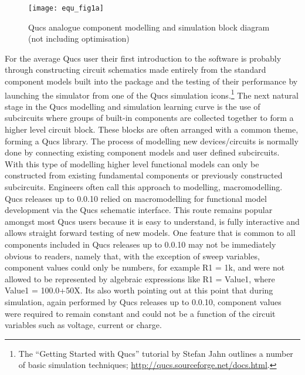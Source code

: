 \begin{figure}
  \centering 
  \texttt{[image: equ\_fig1a]}
  \caption{Qucs analogue component modelling and simulation block diagram (not including optimisation)}
  \label{fig:equ_1}
\end{figure} 

\vspace{5mm}
For the average Qucs user their first introduction to the software is
probably through constructing circuit schematics made entirely from
the standard component models built into the package and the testing
of their performance by launching the simulator from one of the Qucs
simulation icons.\footnote{The ``Getting Started with Qucs'' tutorial
by Stefan Jahn outlines a number of basic simulation techniques;
\url{http://qucs.sourceforge.net/docs.html}.}  The next natural stage
in the Qucs modelling and simulation learning curve is the use of
subcircuits where groups of built-in components are collected together
to form a higher level circuit block.  These blocks are often arranged
with a common theme, forming a Qucs library. The process of modelling
new devices/circuits is normally done by connecting existing component
models and user defined subcircuits. With this type of modelling
higher level functional models can only be constructed from existing
fundamental components or previously constructed
subcircuits. Engineers often call this approach to modelling,
macromodelling.  Qucs releases up to 0.0.10 relied on macromodelling
for functional model development via the Qucs schematic interface.
This route remains popular amongst most Qucs users because it is easy
to understand, is fully interactive and allows straight forward
testing of new models. One feature that is common to all components
included in Qucs releases up to 0.0.10 may not be immediately obvious
to readers, namely that, with the exception of sweep variables,
component values could only be numbers, for example R1 = 1k, and were
not allowed to be represented by algebraic expressions like R1 =
Value1, where Value1 = 100.0+50\cdot X.  Its also worth pointing out
at this point that during simulation, again performed by Qucs releases
up to 0.0.10, component values were required to remain constant and
could not be a function of the circuit variables such as voltage,
current or charge.

\vspace{5mm}

